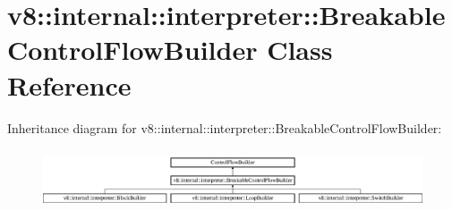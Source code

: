 \hypertarget{classv8_1_1internal_1_1interpreter_1_1_breakable_control_flow_builder}{}\section{v8\+:\+:internal\+:\+:interpreter\+:\+:Breakable\+Control\+Flow\+Builder Class Reference}
\label{classv8_1_1internal_1_1interpreter_1_1_breakable_control_flow_builder}
Inheritance diagram for v8\+:\+:internal\+:\+:interpreter\+:\+:Breakable\+Control\+Flow\+Builder\+:\begin{figure}[H]
\begin{center}
\leavevmode
\includegraphics[height=1.761006cm]{classv8_1_1internal_1_1interpreter_1_1_breakable_control_flow_builder}
\end{center}
\end{figure}
